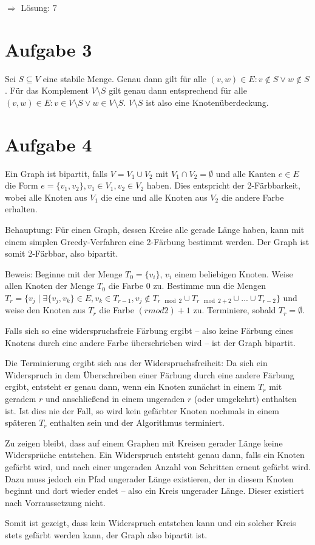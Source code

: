 \documentclass[a4paper]{article}
\begin{document}
$\Rightarrow$ Lösung: $7$

\section{Aufgabe 3}

Sei $S \subseteq V$ eine stabile Menge.
Genau dann gilt für alle $(v, w) \in E: v \not\in S \vee w \not\in S$.
Für das Komplement $V \setminus S$ gilt genau dann entsprechend für alle $(v, w)
\in E: v \in V \setminus S \vee w \in V \setminus S$. $V \setminus S$ ist
also eine Knotenüberdeckung.

\section{Aufgabe 4}

Ein Graph ist bipartit, falls $V = V_1 \cup V_2$ mit $V_1 \cap V_2 = \emptyset$
und alle Kanten $e \in E$ die Form $e = \{v_1, v_2\}, v_1 \in V_1, v_2 \in
V_2$ haben. Dies entspricht der 2-Färbbarkeit, wobei alle Knoten aus $V_1$
die eine und alle Knoten aus $V_2$ die andere Farbe erhalten.

Behauptung: Für einen Graph, dessen Kreise alle gerade Länge haben, kann mit einem simplen
Greedy-Verfahren eine 2-Färbung bestimmt werden. Der Graph ist somit 2-Färbbar, also
bipartit.

Beweis:
Beginne mit der Menge $T_0 = \{v_i\}$, $v_i$ einem beliebigen Knoten.
Weise allen Knoten der Menge $T_0$ die Farbe $0$ zu.
Bestimme nun die Mengen $T_r = \{ v_j \mid \exists \{ v_j, v_k \} \in E, v_k
\in T_{r-1}, v_j \not\in T_{r \mod 2} \cup T_{r \mod 2 + 2} \cup ... \cup
T_{r-2} \}$ und weise den Knoten aus $T_r$ die Farbe $(r mod 2) + 1$ zu.
Terminiere, sobald $T_r = \emptyset$.

Falls sich so eine widerspruchsfreie Färbung ergibt -- also keine Färbung
eines Knotens durch eine andere Farbe überschrieben wird -- ist der Graph
bipartit.

Die Terminierung ergibt sich aus der Widerspruchsfreiheit: Da sich ein
Widerspruch in dem Überschreiben einer Färbung durch eine andere Färbung
ergibt, entsteht er genau dann, wenn ein Knoten zunächst in einem $T_r$ mit
geradem $r$ und anschließend in einem ungeraden $r$ (oder umgekehrt)
enthalten ist. Ist dies nie der Fall, so wird kein gefärbter Knoten nochmals
in einem späteren $T_r$ enthalten sein und der Algorithmus terminiert.

Zu zeigen bleibt, dass auf einem Graphen mit Kreisen gerader Länge keine
Widersprüche entstehen. Ein Widerspruch entsteht genau dann, falls ein
Knoten gefärbt wird, und nach einer ungeraden Anzahl von Schritten erneut
gefärbt wird. Dazu muss jedoch ein Pfad ungerader Länge existieren, der in
diesem Knoten beginnt und dort wieder endet -- also ein Kreis ungerader
Länge. Dieser existiert nach Vorraussetzung nicht.

Somit ist gezeigt, dass kein Widerspruch entstehen kann und ein solcher Kreis
stets gefärbt werden kann, der Graph also bipartit ist.
\end{document}
